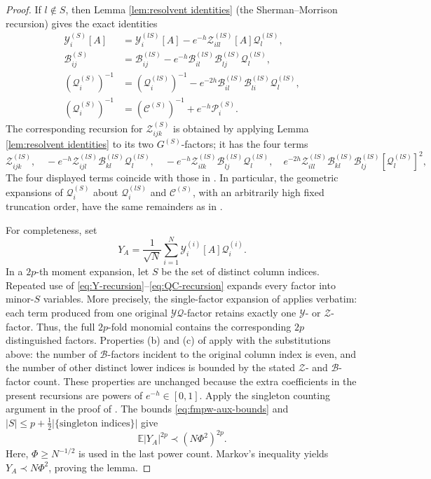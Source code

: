 \documentclass[11pt,reqno]{amsart}
\def\E{\mathbb{E}}
\def\cY{\mathcal{Y}}
\def\cZ{\mathcal{Z}}
\def\cB{\mathcal{B}}
\def\cQ{\mathcal{Q}}
\def\cP{\mathcal{P}}
\def\cC{\mathcal{C}}
\theoremstyle{definition}
\numberwithin{equation}{section}
\numberwithin{figure}{section}
\begin{document}
\begin{proof}
If $l\notin S$, then Lemma \ref{lem:resolvent identities} (the Sherman--Morrison recursion) gives the exact identities
\begin{align}
 \cY_i^{(S)}[A]
 &=
 \cY_i^{(lS)}[A]
 -e^{-h}\cZ_{ill}^{(lS)}[A]\cQ_l^{(lS)},\label{eq:Y-recursion}\\
 \cB_{ij}^{(S)}
 &=
 \cB_{ij}^{(lS)}
 -e^{-h}\cB_{il}^{(lS)}\cB_{lj}^{(lS)}\cQ_l^{(lS)},\label{eq:B-recursion}\\
 (\cQ_i^{(S)})^{-1}
 &=
 (\cQ_i^{(lS)})^{-1}
 -e^{-2h}\cB_{il}^{(lS)}\cB_{li}^{(lS)}\cQ_l^{(lS)},\label{eq:Q-recursion}\\
 (\cQ_i^{(S)})^{-1}
 &=(\cC^{(S)})^{-1}+e^{-h}\cP_i^{(S)}.\label{eq:QC-recursion}
\end{align}
The corresponding recursion for $\cZ_{ijk}^{(S)}$ is obtained by applying
Lemma \ref{lem:resolvent identities} to its two $G^{(S)}$-factors; it has the four terms
\[
 \cZ_{ijk}^{(lS)},\quad
 -e^{-h}\cZ_{ijl}^{(lS)}\cB_{kl}^{(lS)}\cQ_l^{(lS)},\quad
 -e^{-h}\cZ_{ilk}^{(lS)}\cB_{lj}^{(lS)}\cQ_l^{(lS)},\quad
 e^{-2h}\cZ_{ill}^{(lS)}\cB_{kl}^{(lS)}\cB_{lj}^{(lS)}[\cQ_l^{(lS)}]^2,
\]
The four displayed terms coincide with those in \cite[eq (3.6)--(3.12)]{fan2026anisotropic}. In particular, the
geometric expansions of $\cQ_i^{(S)}$ about $\cQ_i^{(lS)}$ and
$\cC^{(S)}$, with an arbitrarily high fixed truncation order, have the
same remainders as in \cite{fan2026anisotropic}.

For completeness, set
\[
 Y_A
 =
 \frac1{\sqrt N}\sum_{i=1}^N
 \cY_i^{(i)}[A]\cQ_i^{(i)}.
\]
In a $2p$-th moment expansion, let $S$ be the set of distinct column
indices. Repeated use of
\eqref{eq:Y-recursion}--\eqref{eq:QC-recursion} expands every factor into
minor-$S$ variables. More precisely, the single-factor expansion of \cite[Lemma 3.11]{fan2026anisotropic} applies verbatim:
each term produced from one original $\cY\cQ$-factor retains exactly one $\cY$- or $\cZ$-factor. Thus, the full $2p$-fold monomial contains the corresponding $2p$ distinguished factors. Properties (b) and (c) of \cite[Lemma 3.11]{fan2026anisotropic} apply with the substitutions above: the number of $\cB$-factors incident to the original column index is even, and the number of other distinct lower indices is bounded by the stated $\cZ$- and $\cB$-factor count. These
properties are unchanged because the extra coefficients in the present recursions are powers of $e^{-h}\in[0,1]$. Apply the singleton counting argument in the proof of
\cite[Lemma 3.4]{fan2026anisotropic}. The bounds
\eqref{eq:fmpw-aux-bounds} and $|S|\le p+\frac12|\{\text{singleton indices}\}|$ give
\[
    \E|Y_A|^{2p}\prec(N\Phi^2)^{2p}.
\]
Here, $\Phi\ge N^{-1/2}$ is used in the last power count. Markov's
inequality yields $Y_A\prec N\Phi^2$, proving the lemma.
\end{proof}
\end{document}
